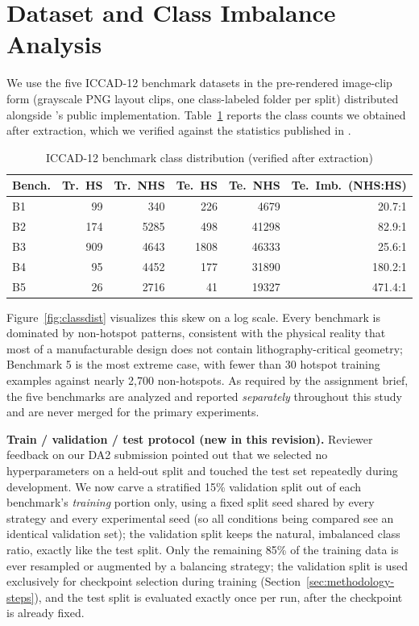 \documentclass[conference]{IEEEtran}
\begin{document}
\section{Dataset and Class Imbalance Analysis}
\label{sec:dataset}
We use the five ICCAD-12 benchmark datasets in the pre-rendered
image-clip form (grayscale PNG layout clips, one class-labeled folder
per split) distributed alongside \cite{borisov2018}'s public
implementation. Table~\ref{tab:dataset} reports the class counts we
obtained after extraction, which we verified against the statistics
published in \cite{borisov2018}.

\begin{table}[H]
\centering
\caption{ICCAD-12 benchmark class distribution (verified after extraction)}
\label{tab:dataset}
\begin{tabular}{lrrrrr}
\toprule
Bench. & Tr.\ HS & Tr.\ NHS & Te.\ HS & Te.\ NHS & Te.\ Imb.\ (NHS:HS) \\
\midrule
B1 & 99  & 340  & 226  & 4679  & 20.7:1  \\
B2 & 174 & 5285 & 498  & 41298 & 82.9:1  \\
B3 & 909 & 4643 & 1808 & 46333 & 25.6:1  \\
B4 & 95  & 4452 & 177  & 31890 & 180.2:1 \\
B5 & 26  & 2716 & 41   & 19327 & 471.4:1 \\
\bottomrule
\end{tabular}
\end{table}

Figure~\ref{fig:classdist} visualizes this skew on a log scale. Every
benchmark is dominated by non-hotspot patterns, consistent with the
physical reality that most of a manufacturable design does not contain
lithography-critical geometry; Benchmark 5 is the most extreme case,
with fewer than 30 hotspot training examples against nearly 2{,}700
non-hotspots. As required by the assignment brief, the five benchmarks
are analyzed and reported \emph{separately} throughout this study and
are never merged for the primary experiments.

\textbf{Train / validation / test protocol (new in this revision).}
Reviewer feedback on our DA2 submission pointed out that we selected
no hyperparameters on a held-out split and touched the test set
repeatedly during development. We now carve a stratified 15\%
validation split out of each benchmark's \emph{training} portion only,
using a fixed split seed shared by every strategy and every
experimental seed (so all conditions being compared see an identical
validation set); the validation split keeps the natural, imbalanced
class ratio, exactly like the test split. Only the remaining 85\% of
the training data is ever resampled or augmented by a balancing
strategy; the validation split is used exclusively for checkpoint
selection during training (Section~\ref{sec:methodology-steps}), and
the test split is evaluated exactly once per run, after the checkpoint
is already fixed.
\end{document}
